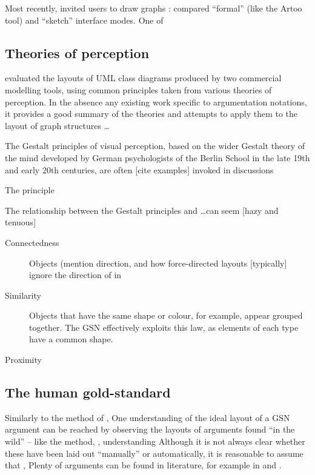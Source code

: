 \begin{itemize*}
Most recently, \citet{5674033} invited users to draw graphs :
compared ``formal'' (like the Artoo tool) and ``sketch'' interface modes.
One of

\subsection{Theories of perception}

\citet{kennysun} evaluated the layouts of UML class diagrams produced by two commercial modelling tools, using common principles taken from various theories of perception.
In the absence any existing work specific to argumentation notations, it provides a good summary of the theories and attempts to apply them to the layout of graph structures \ldots


The Gestalt principles of visual perception,
based on the wider Gestalt theory of the mind developed by German psychologists of the Berlin School in the late 19th and early 20th centuries,
are often [cite examples] \citep[136]{storrle} invoked in discussions 

The principle 

The relationship between the Gestalt principles and \ldots can seem [hazy and tenuous]

\begin{description}
    \item[Connectedness] Objects (mention direction, and how force-directed layouts [typically] ignore the direction of in

    \item[Similarity] Objects that have the same shape or colour, for example, appear grouped together.
    The GSN effectively exploits this law, as elements of each type have a common shape.
    
    \item[Proximity]
    
\end{description}



\subsection{The human gold-standard}

Similarly to the method of \citet{5674033}, One understanding of the ideal layout of a GSN argument can be reached by observing the layouts of arguments found ``in the wild'' -- like the method, , understanding 
Although it is not always clear whether these have been laid out ``manually'' or automatically, it is reasonable to assume that , 
Plenty of arguments can be found in literature, for example in \cite{Habli:2006:PPC:1183088.1183090} and  \cite{insilico}.


\end{itemize*}

